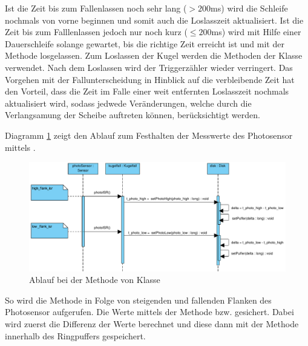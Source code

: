 Ist die Zeit bis zum Fallenlassen noch sehr lang ($>200$ms) wird die Schleife nochmals von vorne beginnen und somit auch die Loslasszeit aktualisiert.
Ist die Zeit bis zum Falllenlassen jedoch nur noch kurz ($\leq200$ms) wird mit Hilfe einer Dauerschleife solange gewartet, bis die richtige Zeit erreicht ist und mit der Methode  losgelassen.
Zum Loslassen der Kugel werden die Methoden der Klasse  verwendet.
Nach dem Loslassen wird der Triggerzähler wieder verringert.
Das Vorgehen mit der Fallunterscheidung in Hinblick auf die verbleibende Zeit hat den Vorteil, dass die Zeit im Falle einer weit entfernten Loslasszeit nochmals aktualisiert wird, sodass jedwede Veränderungen, welche durch die Verlangsamung der Scheibe auftreten können, berücksichtigt werden.



Diagramm \ref{fig:photoISR} zeigt den Ablauf zum Festhalten der Messwerte des Photosensor mittels . 
\begin{figure}[htbp]
	\centering
	\includegraphics[width=\textwidth]{abb/photoISR_cropped}
	\caption{Ablauf bei der Methode  von Klasse }
	\label{fig:photoISR}
\end{figure}
So wird die  Methode  in Folge von steigenden und fallenden Flanken des Photosensor aufgerufen.
Die Werte mittels der Methode  bzw.  gesichert.
Dabei wird zuerst die Differenz der Werte berechnet und diese dann mit der Methode  innerhalb des Ringpuffers gespeichert.


